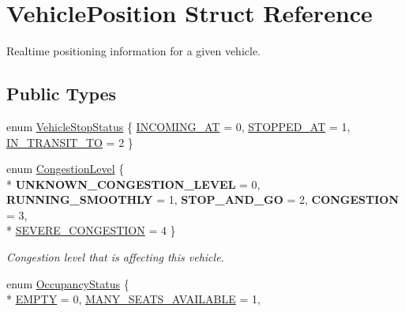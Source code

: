 \hypertarget{structVehiclePosition}{}\section{Vehicle\+Position Struct Reference}
\label{structVehiclePosition}


Realtime positioning information for a given vehicle.  


\subsection*{Public Types}
\begin{DoxyCompactItemize}
\item 
enum \hyperlink{structVehiclePosition_a59db950a979338c8c299fdd5b8383c6e}{Vehicle\+Stop\+Status} \{ \hyperlink{structVehiclePosition_a59db950a979338c8c299fdd5b8383c6ea95978a45776e9d1a6b211ea4d10e852b}{I\+N\+C\+O\+M\+I\+N\+G\+\_\+\+AT} = 0, 
\hyperlink{structVehiclePosition_a59db950a979338c8c299fdd5b8383c6ea665c375499f4e9c38be06ba86c3840ea}{S\+T\+O\+P\+P\+E\+D\+\_\+\+AT} = 1, 
\hyperlink{structVehiclePosition_a59db950a979338c8c299fdd5b8383c6eaa348824abc51d4c2aa2c45fd0c05dc14}{I\+N\+\_\+\+T\+R\+A\+N\+S\+I\+T\+\_\+\+TO} = 2
 \}
\item 
enum \hyperlink{structVehiclePosition_a6b68a02175508df528c0fb3dfc52c7c5}{Congestion\+Level} \{ \\*
{\bfseries U\+N\+K\+N\+O\+W\+N\+\_\+\+C\+O\+N\+G\+E\+S\+T\+I\+O\+N\+\_\+\+L\+E\+V\+EL} = 0, 
{\bfseries R\+U\+N\+N\+I\+N\+G\+\_\+\+S\+M\+O\+O\+T\+H\+LY} = 1, 
{\bfseries S\+T\+O\+P\+\_\+\+A\+N\+D\+\_\+\+GO} = 2, 
{\bfseries C\+O\+N\+G\+E\+S\+T\+I\+ON} = 3, 
\\*
\hyperlink{structVehiclePosition_a6b68a02175508df528c0fb3dfc52c7c5a7a9272ea707c92007d42b72957d8d570}{S\+E\+V\+E\+R\+E\+\_\+\+C\+O\+N\+G\+E\+S\+T\+I\+ON} = 4
 \}\begin{DoxyCompactList}\small\item\em Congestion level that is affecting this vehicle. \end{DoxyCompactList}
\item 
enum \hyperlink{structVehiclePosition_a3b7e3ee1e916599ecb7fd088d4f53f0d}{Occupancy\+Status} \{ \\*
\hyperlink{structVehiclePosition_a3b7e3ee1e916599ecb7fd088d4f53f0da87a5c81df0fd6b1539bacec16fc4c6b5}{E\+M\+P\+TY} = 0, 
\hyperlink{structVehiclePosition_a3b7e3ee1e916599ecb7fd088d4f53f0daf47c028fa64a8263faf6e053d0f43386}{M\+A\+N\+Y\+\_\+\+S\+E\+A\+T\+S\+\_\+\+A\+V\+A\+I\+L\+A\+B\+LE} = 1, 

\end{DoxyCompactItemize}
